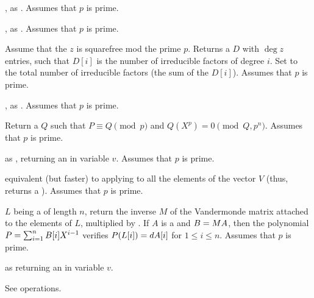 ,
as . Assumes that $p$ is prime.


, as .
Assumes that $p$ is prime.

 Assume
that the  $z$ is squarefree mod the prime $p$. Returns a
 $D$ with $\deg z$ entries, such that $D[i]$ is the number of
irreducible factors of degree $i$. Set  to the total number of
irreducible factors (the sum of the $D[i]$).
Assumes that $p$ is prime.

,\hfil\break
as . Assumes that $p$ is prime.





Return a  $Q$ such that $P\equiv Q\pmod{p}$ and
$Q(X^p)=0\pmod{Q,p^n}$. Assumes that $p$ is prime.

 as ,
returning an  in variable $v$. Assumes that $p$ is prime.

 equivalent (but
faster) to applying  to all the elements of the
vector $V$ (thus, returns a ). Assumes that $p$ is prime.

 $L$ being a 
of length $n$, return the inverse $M$ of the Vandermonde matrix attached to
the elements of $L$, multiplied by .
If $A$ is a  and $B=M\*A$, then the polynomial
$P=\sum_{i=1}^n B[i]\*X^{i-1}$ verifies $P(L[i])=d\*A[i]$ for
$1 \leq i \leq n$. Assumes that $p$ is prime.

 as
 returning an  in variable $v$.

 See  operations.

